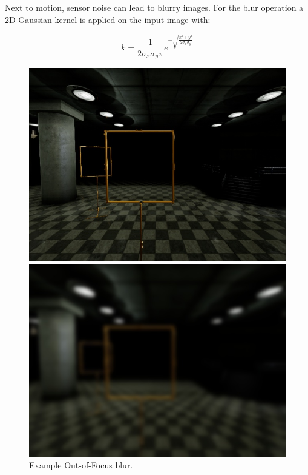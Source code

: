 Next to motion, sensor noise can lead to blurry images. For the blur operation a 2D Gaussian kernel is applied on the input image with:

\begin{equation}
 k = \frac{1}{2\sigma_x\sigma_y\pi}e^{-\sqrt{\frac{x^2 + y^2}{2\sigma_x\sigma_y}}} 
\end{equation}

\begin{figure}[htbp]
	\centering
	\begin{minipage}{0.49\textwidth}
		\includegraphics[width=\textwidth]{fig/gate_example}
	\end{minipage}
	\begin{minipage}{0.49\textwidth}
		\includegraphics[width=\textwidth]{fig/gate_example_focusblur}
	\end{minipage}
	\caption{Example Out-of-Focus blur.}
	\label{fig:focusblur}
\end{figure}

